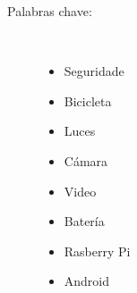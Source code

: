 \begin{description}
\item [Palabras chave:] \mbox{} \\[-20pt]
  \begin{itemize}
    \item Seguridade
    \item Bicicleta
    \item Luces
    \item Cámara
    \item Video
    \item Batería
    \item Rasberry Pi
    \item Android
  \end{itemize}
\end{description}
